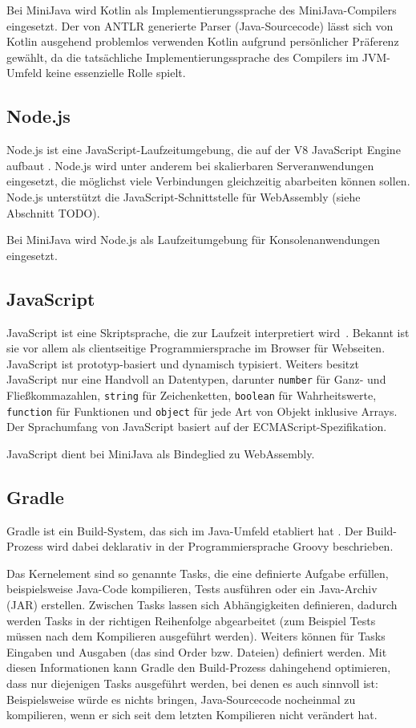 Bei MiniJava wird Kotlin als Implementierungssprache des MiniJava-Compilers eingesetzt. Der von ANTLR generierte Parser (Java-Sourcecode) lässt sich von Kotlin ausgehend problemlos verwenden Kotlin aufgrund persönlicher Präferenz gewählt, da die tatsächliche Implementierungssprache des Compilers im JVM-Umfeld keine essenzielle Rolle spielt.

\subsection{Node.js}
Node.js ist eine JavaScript-Laufzeitumgebung, die auf der V8 JavaScript Engine aufbaut \cite{NodeJSDocumentation}. Node.js wird unter anderem bei skalierbaren Serveranwendungen eingesetzt, die möglichst viele Verbindungen gleichzeitig abarbeiten können sollen. Node.js unterstützt die JavaScript-Schnittstelle für WebAssembly (siehe Abschnitt TODO).

Bei MiniJava wird Node.js als Laufzeitumgebung für Konsolenanwendungen eingesetzt.

\subsection{JavaScript}
JavaScript ist eine Skriptsprache, die zur Laufzeit interpretiert wird \cite{MDNJavaScript}. Bekannt ist sie vor allem als clientseitige Programmiersprache im Browser für Webseiten. JavaScript ist prototyp-basiert und dynamisch typisiert. Weiters besitzt JavaScript nur eine Handvoll an Datentypen, darunter \lstinline{number} für Ganz- und Fließkommazahlen, \lstinline{string} für Zeichenketten, \lstinline{boolean} für Wahrheitswerte, \lstinline{function} für Funktionen und \lstinline{object} für jede Art von Objekt inklusive Arrays. Der Sprachumfang von JavaScript basiert auf der ECMAScript-Spezifikation.

JavaScript dient bei MiniJava als Bindeglied zu WebAssembly.

\subsection{Gradle}
Gradle ist ein Build-System, das sich im Java-Umfeld etabliert hat \cite{Gradle}. Der Build-Prozess wird dabei deklarativ in der Programmiersprache Groovy beschrieben.

Das Kernelement sind so genannte Tasks, die eine definierte Aufgabe erfüllen, beispielsweise Java-Code kompilieren, Tests ausführen oder ein Java-Archiv (JAR) erstellen. Zwischen Tasks lassen sich Abhängigkeiten definieren, dadurch werden Tasks in der richtigen Reihenfolge abgearbeitet (zum Beispiel Tests müssen nach dem Kompilieren ausgeführt werden). Weiters können für Tasks Eingaben und Ausgaben (das sind Order bzw. Dateien) definiert werden. Mit diesen Informationen kann Gradle den Build-Prozess dahingehend optimieren, dass nur diejenigen Tasks ausgeführt werden, bei denen es auch sinnvoll ist: Beispielsweise würde es nichts bringen, Java-Sourcecode nocheinmal zu kompilieren, wenn er sich seit dem letzten Kompilieren nicht verändert hat.

